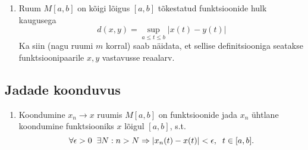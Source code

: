 \documentclass{article}[12pt]
\newcommand{\h}{\hspace{0.2cm}}
\theoremstyle{definition}
\theoremstyle{definition}
\theoremstyle{definition}
\begin{document}
\begin{enumerate}
	\item Ruum $M[a,b]$ on kõigi lõigus $[a,b]$ tõkestatud funktsioonide hulk kaugusega
	\[
		d(x,y) = \sup_{a\leq t \leq b} |x(t)-y(t)|
	\]
	Ka siin (nagu ruumi $m$ korral) saab näidata, et sellise definitsiooniga seatakse funktsioonipaarile $x,y$ vastavusse reaalarv.


\end{enumerate}

\subsection*{Jadade koonduvus}

\begin{enumerate}
	\item Koondumine $x_n\rightarrow x$ ruumis $M[a,b]$ on funktsioonide jada $x_n$ ühtlane koondumine funktsiooniks $x$ lõigul $[a,b]$, s.t.
	\[
		\forall\epsilon>0\h\exists N: n>N\Rightarrow |x_n(t)-x(t)|<\epsilon,\h t\in[a,b].
	\]
\end{enumerate}
\end{document}
